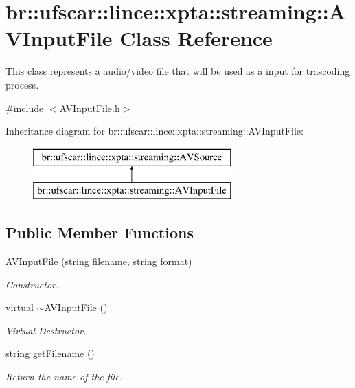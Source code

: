 \hypertarget{classbr_1_1ufscar_1_1lince_1_1xpta_1_1streaming_1_1AVInputFile}{
\section{br::ufscar::lince::xpta::streaming::AVInputFile Class Reference}
\label{classbr_1_1ufscar_1_1lince_1_1xpta_1_1streaming_1_1AVInputFile}
}


This class represents a audio/video file that will be used as a input for trascoding process.  




{\ttfamily \#include $<$AVInputFile.h$>$}

Inheritance diagram for br::ufscar::lince::xpta::streaming::AVInputFile:\begin{figure}[H]
\begin{center}
\leavevmode
\includegraphics[height=2cm]{classbr_1_1ufscar_1_1lince_1_1xpta_1_1streaming_1_1AVInputFile}
\end{center}
\end{figure}
\subsection*{Public Member Functions}
\begin{DoxyCompactItemize}
\item 
\hyperlink{classbr_1_1ufscar_1_1lince_1_1xpta_1_1streaming_1_1AVInputFile_a7801f6e3ccb81fea42b18fd0a0177ff9}{AVInputFile} (string filename, string format)
\begin{DoxyCompactList}\small\item\em Constructor. \item\end{DoxyCompactList}\item 
virtual \hyperlink{classbr_1_1ufscar_1_1lince_1_1xpta_1_1streaming_1_1AVInputFile_a82740533847b4a48be055571a7298da6}{$\sim$AVInputFile} ()
\begin{DoxyCompactList}\small\item\em Virtual Destructor. \item\end{DoxyCompactList}\item 
string \hyperlink{classbr_1_1ufscar_1_1lince_1_1xpta_1_1streaming_1_1AVInputFile_a3e3ebb2a99ae21d27a370c85fdf79741}{getFilename} ()
\begin{DoxyCompactList}\small\item\em Return the name of the file. \item\end{DoxyCompactList}\end{DoxyCompactItemize}
